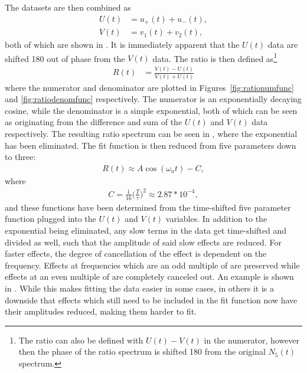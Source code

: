 The datasets are then combined as 
    \begin{equation}
    \begin{aligned}
        U(t) &= u_{+}(t) + u_{-}(t), \\
        V(t) &= v_{1}(t) + v_{2}(t),
    \label{eq:UandV}
    \end{aligned}
    \end{equation}
both of which are shown in . It is immediately apparent that the $U(t)$ data are shifted 180\textdegree{} out of phase from the $V(t)$ data. The ratio is then defined as\footnote{The ratio can also be defined with $U(t) - V(t)$ in the numerator, however then the phase of the ratio spectrum is shifted 180\textdegree{} from the original $N_{5}(t)$ spectrum.}
    \begin{align}
        R(t) &= \frac{V(t) - U(t)}{V(t) + U(t)}
    \label{eq:ratioUV}
    \end{align}
where the numerator and denominator are plotted in Figures~\ref{fig:rationumfunc} and \ref{fig:ratiodenomfunc} respectively. The numerator is an exponentially decaying cosine, while the denominator is a simple exponential, both of which can be seen as originating from the difference and sum of the $U(t)$ and $V(t)$ data respectively. The resulting ratio spectrum can be seen in , where the exponential has been eliminated. The fit function is then reduced from five parameters down to three:
    \begin{align}
        R(t) \approx A \cos(\omega_{a}t) - C,
    \label{eq:ratiowithC}
    \end{align}
where  
    \begin{align}
        C = \frac{1}{16} \Big(\frac{T}{\tau}\Big)^{2} \approx 2.87 * 10^{-4},
    \end{align}
and these functions have been determined from the time-shifted five parameter function plugged into the $U(t)$ and $V(t)$ variables. In addition to the exponential being eliminated, any slow terms in the data get time-shifted and divided as well, such that the amplitude of said slow effects are reduced. For faster effects, the degree of cancellation of the effect is dependent on the frequency. Effects at frequencies which are an odd multiple of \wa are preserved while effects at an even multiple of \wa are completely canceled out. An example is shown in . While this makes fitting the data easier in some cases, in others it is a downside that effects which still need to be included in the fit function now have their amplitudes reduced, making them harder to fit.



